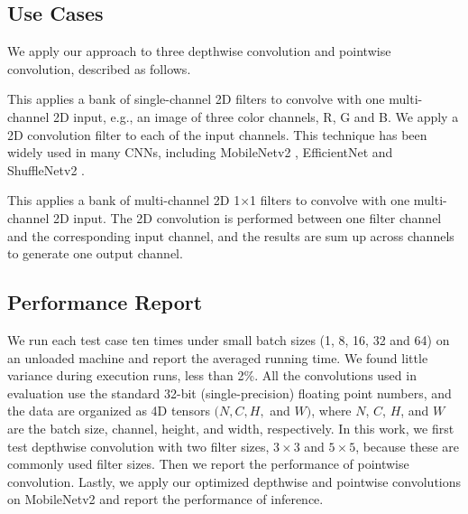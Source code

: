 \subsection{Use Cases}
We apply our approach to three depthwise convolution and pointwise convolution, described as follows.

 This applies a bank of single-channel 2D filters to convolve with one multi-channel 2D input, e.g., an image of three color channels, R, G and B. We apply a 2D convolution filter to each of the input channels. 
This technique has been widely used in many CNNs, including MobileNetv2 \cite{Sandler_2018_CVPR}, EfficientNet \cite{tan2019efficientnet} and ShuffleNetv2 \cite{Ma_2018_ECCV}.

 This applies a bank of multi-channel 2D 1$\times$1 filters to convolve with one multi-channel 2D input. 
The 2D convolution is performed between one filter channel and the corresponding input channel, and the results are sum up across channels to generate one output channel.


\subsection{Performance Report}
We run each test case ten times under small batch sizes (1, 8, 16, 32 and 64) on an unloaded machine and report the averaged running time. 
We found little variance during execution runs, less than 2\%.  
All the convolutions used in evaluation use the standard 32-bit (single-precision) floating point numbers, and the data are organized as 4D tensors $(N,C,H,$ and $W)$, where $N$, $C$, $H$, and $W$ are the batch size, channel, height, and width, respectively. 
In this work, we first test depthwise convolution with two filter sizes, $3 \times 3$ and $5 \times 5$, because these are commonly used filter sizes. 
Then we report the performance of pointwise convolution. 
Lastly, we apply our optimized depthwise and pointwise convolutions on MobileNetv2 and report the performance of inference.
%

